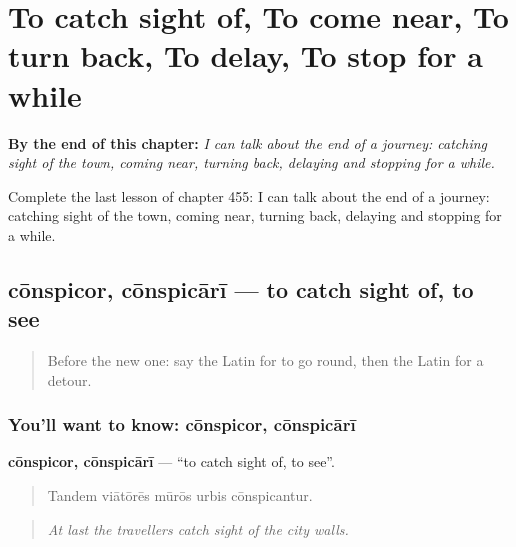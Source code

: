
\chapter{To catch sight of, To come near, To turn back, To delay, To stop for a while}
\label{ch:la-to-catch-sight-of-to-come-near-to-turn-back-to-delay-to-stop-for-a-while}

\begin{chapteropening}
\textbf{By the end of this chapter:} \emph{I can talk about the end of a journey: catching sight of the town, coming near, turning back, delaying and stopping for a while.}

Complete the last lesson of chapter 455: I can talk about the end of a journey: catching sight of the town, coming near, turning back, delaying and stopping for a while.
\end{chapteropening}

\section[cōnspicor, cōnspicārī]{cōnspicor, cōnspicārī — to catch sight of, to see}

\label{lesson:LA-C455-conspicor}



\begin{quote}
Before the new one: say the Latin for to go round, then the Latin for a detour.
\end{quote}

\subsection*{You'll want to know: cōnspicor, cōnspicārī}
\textbf{cōnspicor, cōnspicārī} — \textquotedblleft{}to catch sight of, to see\textquotedblright{}.

\begin{quote}
Tandem viātōrēs mūrōs urbis cōnspicantur.
\end{quote}

\begin{quote}
\emph{At last the travellers catch sight of the city walls.}
\end{quote}

